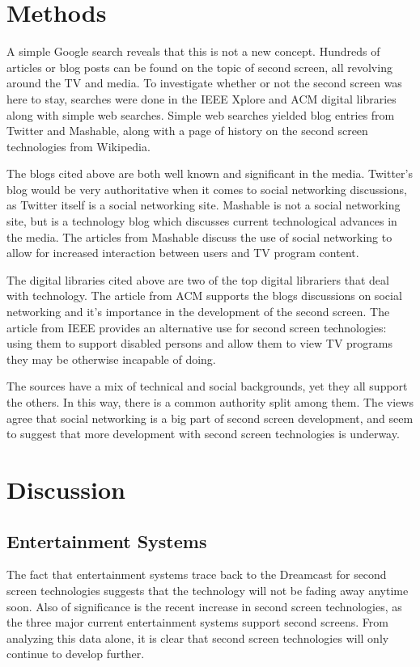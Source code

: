 \documentclass[11pt, oneside]{article}
\begin{document}
\section{Methods}
A simple Google search reveals that this is not a new concept. Hundreds of articles or blog posts can be found on the topic of second screen, all revolving around the TV and media. To investigate whether or not the second screen was here to stay, searches were done in the IEEE Xplore and ACM digital libraries along with simple web searches. Simple web searches yielded blog entries from Twitter and Mashable, along with a page of history on the second screen technologies from Wikipedia.

The blogs cited above are both well known and significant in the media. Twitter's blog would be very authoritative when it comes to social networking discussions, as Twitter itself is a social networking site. Mashable is not a social networking site, but is a technology blog which discusses current technological advances in the media. The articles from Mashable discuss the use of social networking to allow for increased interaction between users and TV program content. 

The digital libraries cited above are two of the top digital librariers that deal with technology. The article from ACM supports the blogs discussions on social networking and it's importance in the development of the second screen. The article from IEEE provides an alternative use for second screen technologies: using them to support disabled persons and allow them to view TV programs they may be otherwise incapable of doing.

The sources have a mix of technical and social backgrounds, yet they all support the others. In this way, there is a common authority split among them. The views agree that social networking is a big part of second screen development, and seem to suggest that more development with second screen technologies is underway.

\section{Discussion}

\subsection{Entertainment Systems}
The fact that entertainment systems trace back to the Dreamcast for second screen technologies suggests that the technology will not be fading away anytime soon. Also of significance is the recent increase in second screen technologies, as the three major current entertainment systems support second screens. From analyzing this data alone, it is clear that second screen technologies will only continue to develop further.
\end{document}
